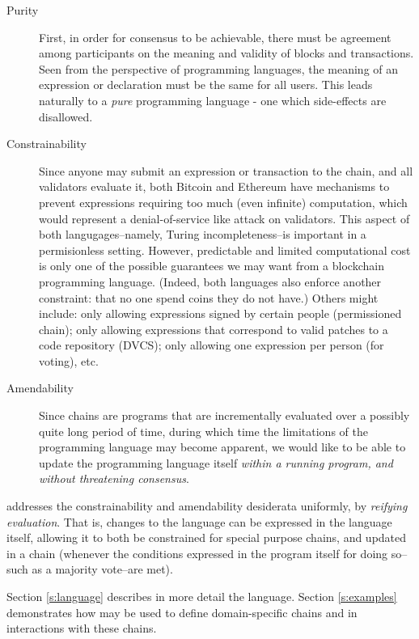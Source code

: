 \begin{description}
  \item [Purity] First, in order for consensus to be achievable, there must be
      agreement among participants on the meaning and validity of blocks and
        transactions. Seen from the perspective of programming languages, the
        meaning of an expression or declaration must be the same for all users.
        This leads naturally to a \textit{pure} programming language - one
        which side-effects are disallowed.

  \item [Constrainability] Since anyone may submit an expression or transaction
      to the chain, and all validators evaluate it, both Bitcoin and Ethereum
        have mechanisms to prevent expressions requiring too much (even
        infinite) computation, which would represent a denial-of-service like
        attack on validators. This aspect of both langugages--namely, Turing
        incompleteness--is important in a permisionless setting. However,
        predictable and limited computational cost is only one of the possible
        guarantees we may want from a blockchain programming language. (Indeed,
        both languages also enforce another constraint: that no one spend coins
        they do not have.) Others might include: only allowing expressions
        signed by certain people (permissioned chain); only allowing
        expressions that correspond to valid patches to a code repository
        (DVCS); only allowing one expression per person (for voting), etc.

  \item [Amendability] Since chains are programs that are
      incrementally evaluated over a possibly quite long period of time, during
        which time the limitations of the programming language may become
        apparent, we would like to be able to update the programming language
        itself \textit{within a running program, and without threatening
        consensus}.

\end{description}

\rad addresses the constrainability and amendability desiderata uniformly, by
\textit{reifying evaluation}. That is, changes to the language can be expressed
in the language itself, allowing it to both be constrained for special
purpose chains, and updated in a chain (whenever the conditions expressed in
the program itself for doing so--such as a majority vote--are met).

Section \ref{s:language} describes in more detail \rad the language. Section
\ref{s:examples} demonstrates how \rad may be used to define domain-specific
chains and in interactions with these chains.

